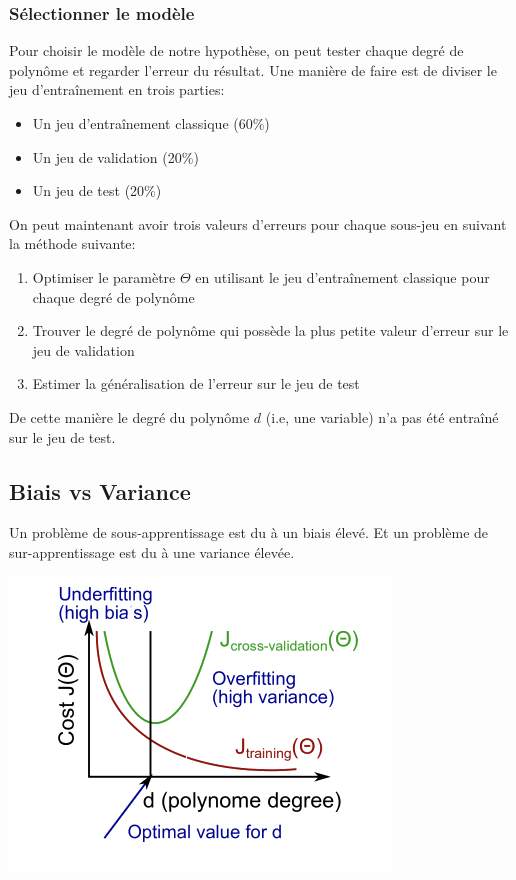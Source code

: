 \documentclass{article}
\theoremstyle{definition}
\begin{document}
\subsubsection{Sélectionner le modèle}
Pour choisir le modèle de notre hypothèse, on peut tester chaque degré de polynôme et regarder l'erreur du résultat. Une manière de faire est de diviser le jeu d'entraînement en trois parties:
\begin{itemize}
\item Un jeu d'entraînement classique (60\%)
\item Un jeu de validation (20\%)
\item Un jeu de test (20\%)
\end{itemize}
On peut maintenant avoir trois valeurs d'erreurs pour chaque sous-jeu en suivant la méthode suivante:
\begin{enumerate}
\item Optimiser le paramètre $\Theta$ en utilisant le jeu d'entraînement classique pour chaque degré de polynôme
\item Trouver le degré de polynôme qui possède la plus petite valeur d'erreur sur le jeu de validation
\item Estimer la généralisation de l'erreur sur le jeu de test
\end{enumerate}
De cette manière le degré du polynôme $d$ (i.e, une variable) n'a pas été entraîné sur le jeu de test.\par
\subsection{Biais vs Variance}
Un problème de sous-apprentissage est du à un biais élevé. Et un problème de sur-apprentissage est du à une variance élevée. \par
\includegraphics{biasvsvariance}
\end{document}

